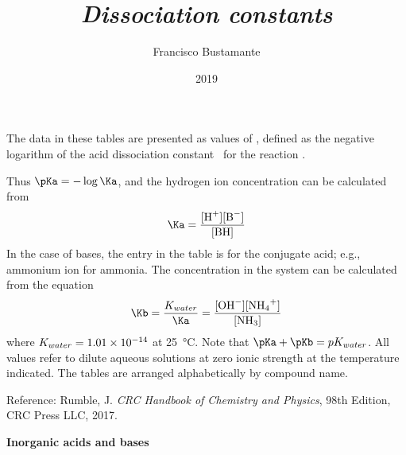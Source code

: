\documentclass[a4paper, 10pt]{article}
\author{Francisco Bustamante}
\title{\textit{Dissociation constants}}
\date{2019}
\begin{document}
\small

\twocolumn

The data in these tables are presented as values of \pKa, defined as the negative
logarithm of the acid dissociation constant \Ka\, for the reaction .

Thus $\pKa = -\log \Ka$, and the hydrogen ion concentration \ce{[H+]} can be
calculated from
%
\begin{align*}
    \Ka = \frac{\ce{[H^+][B^-]}}{\ce{[BH]}}
\end{align*}
%
In the case of bases, the entry in the table is for the conjugate acid; e.g.,
ammonium ion for ammonia. The  concentration in the system
 can be calculated from the equation
%
\begin{align*}
    \Kb = \frac{K_{water}}{\Ka} = \frac{\ce{[OH^-][NH4^+]}}{\ce{[NH3]}}
\end{align*}
%
where $K_{water} = \num{1.01d-14}$ at \SI{25}{\celsius}. Note that
$\pKa + \pKb = pK_{water}$. All values refer to dilute aqueous solutions at zero
ionic strength at the temperature indicated. The tables are arranged
alphabetically by compound name.

Reference: Rumble, J. \textit{CRC Handbook of Chemistry and Physics}, 98th
Edition, CRC Press LLC, 2017.

\begin{center}
    \begin{large}
        \textbf{Inorganic acids and bases}
    \end{large}
\end{center}

\end{document}
